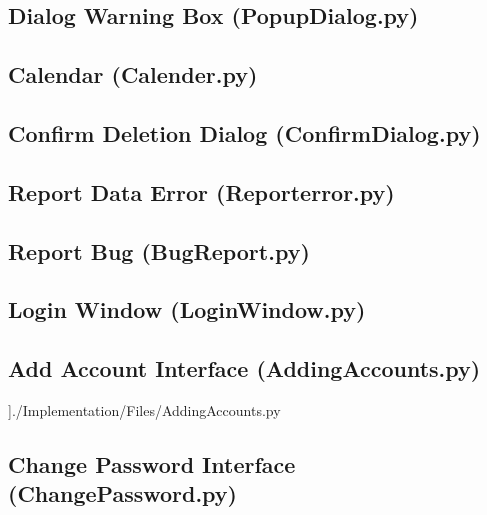 \begin{landscape}
\newpage
\subsection{Dialog Warning Box (PopupDialog.py)}\label{PPD}

\newpage
\subsection{Calendar (Calender.py)}\label{C}

\newpage
\subsection{Confirm Deletion Dialog (ConfirmDialog.py)}\label{CD}

\newpage
\subsection{Report Data Error (Reporterror.py)}\label{RE}

\newpage
\subsection{Report Bug (BugReport.py)}\label{BR}

\newpage
\subsection{Login Window (LoginWindow.py)}\label{LW}

\newpage
\subsection{Add Account Interface (AddingAccounts.py)}\label{AAI}
\pythonfile[firstline=1]]{./Implementation/Files/AddingAccounts.py}

\newpage
\subsection{Change Password Interface (ChangePassword.py)}\label{CP}


\end{landscape}
